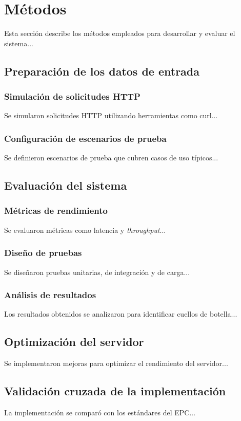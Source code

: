\chapter{Métodos}
\label{sec:Metodos}
Esta sección describe los métodos empleados para desarrollar y evaluar el sistema...

\section{Preparación de los datos de entrada}
\label{subsec:PreparacionDatos}
\subsection{Simulación de solicitudes HTTP}
\label{subsubsec:SimulacionSolicitudes}
Se simularon solicitudes HTTP utilizando herramientas como curl...

\subsection{Configuración de escenarios de prueba}
\label{subsubsec:EscenariosPrueba}
Se definieron escenarios de prueba que cubren casos de uso típicos...

\section{Evaluación del sistema}
\label{subsec:EvaluacionSistema}
\subsection{Métricas de rendimiento}
\label{subsubsec:MetricasRendimiento}
Se evaluaron métricas como latencia y \textit{throughput}...

\subsection{Diseño de pruebas}
\label{subsubsec:DisenoPruebas}
Se diseñaron pruebas unitarias, de integración y de carga...

\subsection{Análisis de resultados}
\label{subsubsec:AnalisisResultados}
Los resultados obtenidos se analizaron para identificar cuellos de botella...

\section{Optimización del servidor}
\label{subsec:Optimizacion}
Se implementaron mejoras para optimizar el rendimiento del servidor...

\section{Validación cruzada de la implementación}
\label{subsec:ValidacionCruzada}
La implementación se comparó con los estándares del EPC...
